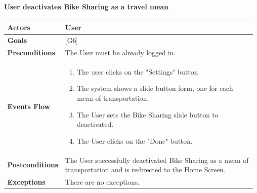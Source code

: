 \documentclass[12pt]{article}
\begin{document}
\paragraph{User deactivates Bike Sharing as a travel mean}
\begin{center}
    \begin{tabular} { |p{}|p{}| }
        \hline
        \textbf{Actors} & User \\ 
        \hline
        \textbf{Goals} & {[G6]} \\ 
        \hline  
        \textbf{Preconditions} & The User must be already logged in. \\ 
        \hline
        \textbf{Events Flow} & \begin{enumerate} 
                            \setlength{\itemsep}{0.5pt}
                            \item The user clicks on the "Settings" button
                            \item The system shows a slide button form, one for each mean of transportation.
                            \item The User sets the Bike Sharing slide button to deactivated.
                            \item The User clicks on the "Done" button.
                            \end{enumerate} \\
        \hline
        \textbf{Postconditions} & The User successfully deactivated Bike Sharing as a mean of transportation and is redirected to the Home Screen. \\
        \hline
        \textbf{Exceptions} & There are no exceptions.\\ 
        \hline
     \end{tabular}
\end{center}
\end{document}
